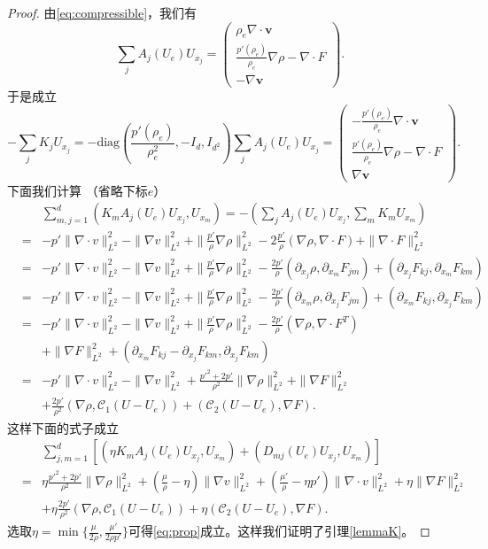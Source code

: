 \documentclass{article}
\begin{document}
\begin{proof}
由\eqref{eq:compressible}，我们有
$$
\sum_j A_j(U_e) U_{x_j}=\left( \begin{array}{cc} \rho_e\nabla\cdot\mathbf v\\ \frac{p'(\rho_e)}{\rho_e}\nabla\rho - \nabla\cdot F\\ -\nabla \mathbf v\end{array} \right).
$$
于是成立
$$
-\sum_j K_jU_{x_j}=-\mbox{diag}\left(\frac{p'(\rho_e)}{\rho_e^2}, -I_d, I_{d^2}\right)\sum_j A_j(U_e) U_{x_j}=\left( \begin{array}{cc} -\frac{p'(\rho_e)}{\rho_e}\nabla\cdot\mathbf v\\ \frac{p'(\rho_e)}{\rho_e}\nabla \rho - \nabla\cdot F\\ \nabla \mathbf v\end{array} \right).
$$
下面我们计算 （省略下标$e$）
\begin{eqnarray*}
   && \sum_{m,j=1}^d (K_m  A_j(U_e) U_{x_j},U_{x_m}) = -(\sum_j A_j(U_e) U_{x_j}, \sum_m K_m U_{x_m})\\
  &=& - p' \|\nabla \cdot  v \|_{L^2}^2 - \|\nabla v \|_{L^2}^2+ \|\frac{p'}{\rho} \nabla \rho \|_{L^2}^2 - 2\frac{p'}{\rho} (\nabla\rho, \nabla\cdot F) +  \|\nabla\cdot F\|_{L^2}^2  \\
  &=& - p' \|\nabla \cdot  v \|_{L^2}^2 - \|\nabla v \|_{L^2}^2+ \|\frac{p'}{\rho} \nabla \rho \|_{L^2}^2 -  \frac{2p'}{\rho}( \partial_{x_j} \rho,\partial_{x_m} F_{jm}) + ( \partial_{x_j} F_{kj},\partial_{x_m} F_{km})\\
     &=& - p' \|\nabla \cdot  v \|_{L^2}^2 - \|\nabla v \|_{L^2}^2+ \|\frac{p'}{\rho} \nabla \rho \|_{L^2}^2-  \frac{2p'}{\rho} (\partial_{x_m} \rho,\partial_{x_j} F_{jm}) +  ( \partial_{x_m} F_{kj},\partial_{x_j} F_{km})\\
     &=&  - p' \|\nabla \cdot  v \|_{L^2}^2 - \|\nabla v \|_{L^2}^2+ \|\frac{p'}{\rho} \nabla \rho \|_{L^2}^2-  \frac{2p'}{\rho}(\nabla \rho,\nabla\cdot F^T)\\
     && + \|\nabla F\|_{L^2}^2
     + ( \partial_{x_m} F_{kj} - \partial_{x_j} F_{km},\partial_{x_j} F_{km}) \\
     &=&  - p' \|\nabla \cdot  v \|_{L^2}^2 - \|\nabla v \|_{L^2}^2+ \frac{p'^2 + 2p'}{\rho^2} \|\nabla \rho \|_{L^2}^2+ \|\nabla F\|_{L^2}^2 \\
     &&+ \frac{2p'}{\rho^2}(\nabla \rho, {\mathcal C}_1(U - U_e)) + ({\mathcal C}_2(U - U_e), \nabla F).
\end{eqnarray*}
这样下面的式子成立
\begin{eqnarray*}
 && \sum_{j,m=1}^d[ ( \eta K_m A_j(U_e) U_{x_j},U_{x_m}) + (D_{mj}(U_e) U_{x_j},U_{x_m})] \\
  &=& \eta\frac{p'^2 + 2 p'}{\rho^2} \|\nabla \rho \|_{L^2}^2 + (\frac{\mu}{\rho} - \eta   ) \|\nabla v \|_{L^2}^2+ (\frac{\mu'}{\rho} - \eta  p' ) \|\nabla \cdot  v \|_{L^2}^2+ \eta \|\nabla F\|_{L^2}^2\\
  && + \eta\frac{2p'}{\rho^2}(\nabla \rho, {\mathcal C}_1(U - U_e)) + \eta({\mathcal C}_2(U - U_e), \nabla F).
\end{eqnarray*}
选取$\eta=\min\{ \frac{\mu}{2\rho}, \frac{\mu'}{2\rho p'}\}$可得\eqref{eq:prop}成立。这样我们证明了引理\ref{lemmaK}。
\end{proof}{}
\end{document}
